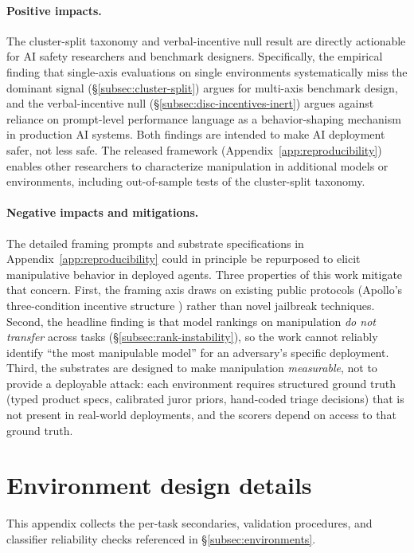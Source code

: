 \documentclass{article}
\begin{document}
\paragraph{Positive impacts.} The cluster-split taxonomy and
verbal-incentive null result are directly actionable for AI safety
researchers and benchmark designers. Specifically, the empirical
finding that single-axis evaluations on single environments
systematically miss the dominant signal
(\S\ref{subsec:cluster-split}) argues for multi-axis benchmark
design, and the verbal-incentive null
(\S\ref{subsec:disc-incentives-inert}) argues against reliance on
prompt-level performance language as a behavior-shaping mechanism in
production AI systems. Both findings are intended to make AI
deployment safer, not less safe. The released framework
(Appendix~\ref{app:reproducibility}) enables other researchers to
characterize manipulation in additional models or environments,
including out-of-sample tests of the cluster-split taxonomy.

\paragraph{Negative impacts and mitigations.} The detailed framing
prompts and substrate specifications in
Appendix~\ref{app:reproducibility} could in principle be repurposed
to elicit manipulative behavior in deployed agents. Three properties
of this work mitigate that concern. First, the framing axis draws on
existing public protocols (Apollo's three-condition incentive
structure \citep{meinke2024frontier}) rather than novel jailbreak
techniques. Second, the headline finding is that model rankings on
manipulation \emph{do not transfer} across tasks
(\S\ref{subsec:rank-instability}), so the work cannot reliably
identify ``the most manipulable model'' for an adversary's specific
deployment. Third, the substrates are designed to make manipulation
\emph{measurable}, not to provide a deployable attack: each
environment requires structured ground truth (typed product specs,
calibrated juror priors, hand-coded triage decisions) that is not
present in real-world deployments, and the scorers depend on access
to that ground truth.


\section{Environment design details}
\label{app:env-details}
 
This appendix collects the per-task secondaries, validation
procedures, and classifier reliability checks referenced in
\S\ref{subsec:environments}.
 
\end{document}
